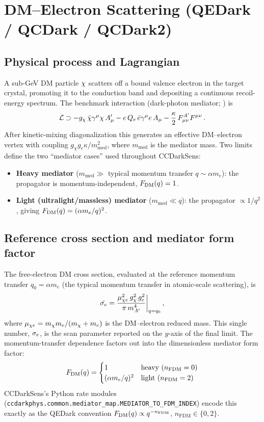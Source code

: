 \section{DM--Electron Scattering (QEDark / QCDark / QCDark2)}
\label{sec:dme}

\subsection{Physical process and Lagrangian}

A sub-GeV DM particle $\chi$ scatters off a bound valence electron in the
target crystal, promoting it to the conduction band and depositing a
continuous recoil-energy spectrum. The benchmark interaction (dark-photon
mediator; \citealt{Essig2012,Essig2016}) is
\begin{equation}
\mathcal{L} \supset -g_\chi\,\bar{\chi}\gamma^\mu\chi\,A'_\mu
- e\,Q_e\,\bar{e}\gamma^\mu e\,A_\mu
- \frac{\kappa}{2}\,F^{A'}_{\mu\nu}F^{\mu\nu}\,.
\end{equation}
After kinetic-mixing diagonalization this generates an effective
DM--electron vertex with coupling $g_\chi g_e \kappa / m_\mathrm{med}^2$,
where $m_\mathrm{med}$ is the mediator mass. Two limits define the two
``mediator cases'' used throughout CCDarkSens:
\begin{itemize}[leftmargin=*]
  \item \textbf{Heavy mediator} ($m_\mathrm{med} \gg$ typical momentum
        transfer $q \sim \alpha m_e$): the propagator is momentum-independent,
        $F_\mathrm{DM}(q) = 1$.
  \item \textbf{Light (ultralight/massless) mediator} ($m_\mathrm{med} \ll q$):
        the propagator $\propto 1/q^2$, giving $F_\mathrm{DM}(q) = (\alpha m_e / q)^2$.
\end{itemize}

\subsection{Reference cross section and mediator form factor}

The free-electron DM cross section, evaluated at the reference momentum
transfer $q_0 = \alpha m_e$ (the typical momentum transfer in atomic-scale
scattering), is
\begin{equation}
\bar{\sigma_e} = \frac{\mu_{\chi e}^2\, g_\chi^2\, g_e^2}{\pi\, m_{A'}^4}\bigg|_{q=q_0}\,,
\end{equation}
where $\mu_{\chi e} = m_\chi m_e/(m_\chi + m_e)$ is the DM--electron reduced
mass. This single number, $\sigma_e$, is the scan parameter reported on the
$y$-axis of the final limit. The momentum-transfer dependence factors out
into the dimensionless mediator form factor:
\begin{equation}
F_\mathrm{DM}(q) = \begin{cases}
1 & \text{heavy } (n_\mathrm{FDM}=0) \\
(\alpha m_e / q)^2 & \text{light } (n_\mathrm{FDM}=2)
\end{cases}
\end{equation}
CCDarkSens's Python rate modules
(\texttt{ccdarkphys.common.mediator\_map.MEDIATOR\_TO\_FDM\_INDEX}) encode
this exactly as the QEDark convention $F_\mathrm{DM}(q) \propto q^{-n_\mathrm{FDM}}$,
$n_\mathrm{FDM} \in \{0,2\}$.

